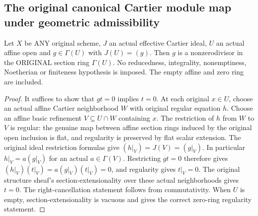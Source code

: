 \subsection{The original canonical Cartier module map under geometric admissibility}
\begin{lemma}
\label{lem:cartier-principal-equation-regular}
\leanok
Let $X$ be ANY original scheme, $J$ an actual effective Cartier ideal,
$U$ an actual affine open and $g\in\Gamma(U)$ with $J(U)=(g)$.
Then $g$ is a nonzerodivisor in the ORIGINAL section ring $\Gamma(U)$.
No reducedness, integrality, nonemptiness, Noetherian or finiteness
hypothesis is imposed. The empty affine and zero ring are included.
\end{lemma}
\begin{proof}
It suffices to show that $gt=0$ implies $t=0$. At each original $x\in U$,
choose an actual affine Cartier neighborhood $W$ with original regular
equation $h$. Choose an affine basic refinement $V\subseteq U\cap W$
containing $x$. The restriction of $h$ from $W$ to $V$ is regular:
the genuine map between affine section rings induced by the original
open inclusion is flat, and regularity is preserved by flat scalar
extension. The original ideal restriction formulas give
$(h|_V)=J(V)=(g|_V)$. In particular $h|_V=a(g|_V)$ for an actual
$a\in\Gamma(V)$. Restricting $gt=0$ therefore gives
$(h|_V)(t|_V)=a(g|_V)(t|_V)=0$, and regularity gives $t|_V=0$.
The original structure sheaf's section-extensionality over these actual
neighborhoods gives $t=0$. The right-cancellation statement follows
from commutativity. When $U$ is empty, section-extensionality is vacuous
and gives the correct zero-ring regularity statement.
\end{proof}

